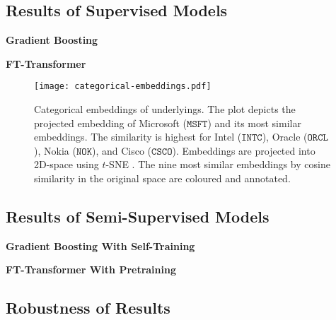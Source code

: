 \subsection{Results of Supervised
    Models}\label{sec:results-of-supervised-models}

\textbf{Gradient Boosting}

\textbf{FT-Transformer}

\begin{figure}[ht]
    \centering
    \texttt{[image: categorical-embeddings.pdf]}
    \caption[Categorical Embeddings of Underlyings]{Categorical embeddings of underlyings. The plot depicts the projected embedding of Microsoft ($\mathtt{MSFT}$) and its most similar embeddings. The similarity is highest for Intel ($\mathtt{INTC}$), Oracle ($\mathtt{ORCL}$), Nokia ($\mathtt{NOK}$), and Cisco ($\mathtt{CSCO}$). Embeddings are projected into 2D-space using $t$-SNE \autocite{vandermaatenVisualizingDataUsing2008}. The nine most similar embeddings by cosine similarity in the original space are coloured and annotated.}
    \label{fig:categorical-embeddings}
\end{figure}


\subsection{Results of Semi-Supervised
    Models}\label{sec:results-of-semi-supervised-models}

\textbf{Gradient Boosting With Self-Training}

\textbf{FT-Transformer With Pretraining}

\subsection{Robustness of Results}\label{sec:robustness-checks}

